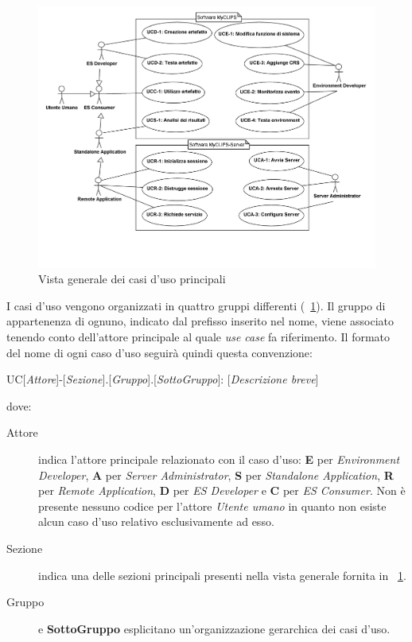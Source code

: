 \begin{figure}
\centering
\includegraphics[width=1.2\textwidth, angle=270]{Immagini/Capitolo2/UseCases/Vista-generale.png}
\caption{Vista generale dei casi d'uso principali}\label{fig:uc-vista-generale}
\end{figure}


I casi d'uso vengono organizzati in quattro gruppi differenti (\figurename~\ref{fig:uc-vista-generale}). Il gruppo di appartenenza di ognuno, indicato dal prefisso inserito nel nome, viene associato tenendo conto dell'attore principale al quale \emph{use case} fa riferimento. Il formato del nome di ogni caso d'uso seguirà quindi questa convenzione:
\begin{center}
UC[\emph{Attore}]-[\emph{Sezione}].[\emph{Gruppo}].[\emph{SottoGruppo}]: [\emph{Descrizione breve}]
\end{center}
dove:


\begin{description}
	\item[Attore] indica l'attore principale relazionato con il caso d'uso: \textbf{E} per \emph{Environment Developer}, \textbf{A} per \emph{Server Administrator}, \textbf{S} per \emph{Standalone Application}, \textbf{R} per \emph{Remote Application}, \textbf{D} per \emph{ES Developer} e \textbf{C} per \emph{ES Consumer}. Non è presente nessuno codice per l'attore \emph{Utente umano} in quanto non esiste alcun caso d'uso relativo esclusivamente ad esso.

	\item[Sezione] indica una delle sezioni principali presenti nella vista generale fornita in \figurename~\ref{fig:uc-vista-generale}.
	
	\item[Gruppo] e \textbf{SottoGruppo} esplicitano un'organizzazione gerarchica dei casi d'uso.

\end{description}

